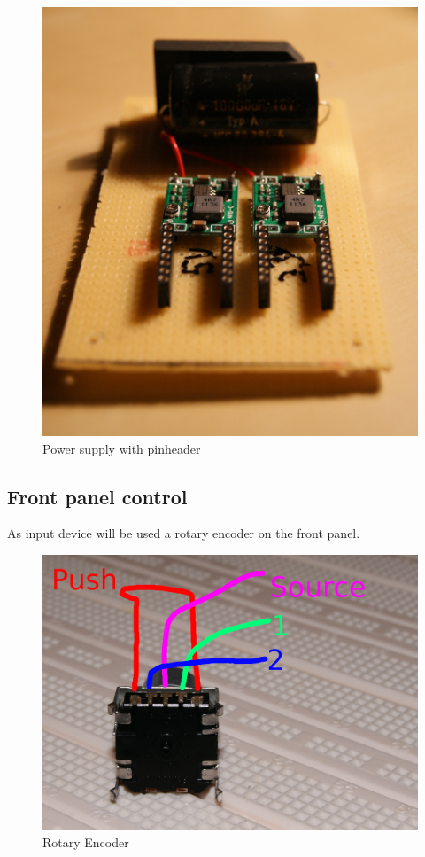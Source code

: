 \begin{figure}[h!]
	\begin{center}
	\includegraphics[scale=0.4]{pictures/powerSupplyPinheader}
	\caption{Power supply with pinheader}
	\end{center}
\end{figure}


\subsection{Front panel control}
As input device will be used a rotary encoder on the front panel.
\begin{figure}[h!]
	\begin{center}
	\includegraphics[scale=0.5]{pictures/rotation_encoder}
	\caption{Rotary Encoder}
	\end{center}
\end{figure}

